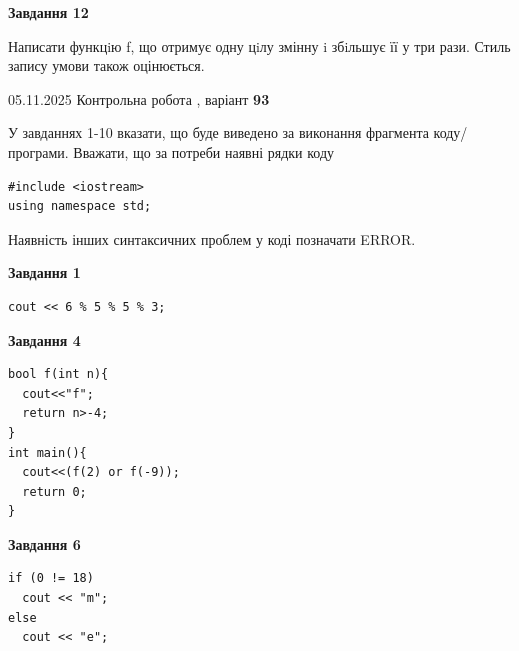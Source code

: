 \documentclass[12pt, ukrainian]{article}
\begin{document}
{\begin {large}
\begin{minipage}[t]{11.0cm}
\begin{center}
\textbf{Завдання 12}
\end{center}

Написати функцiю f, що отримує одну цiлу змінну i збiльшує її у три рази. Стиль запису умови також оцінюється.\par

\end{minipage}

\end {large}}
\newpage

{\Large{05.11.2025 Контрольна робота , варіант  \No \textbf { 93 }\par}}
{
\begin {large}
У завданнях 1-10 вказати, що буде виведено за виконання фрагмента коду/про\-гра\-ми.
Вважати, що за потреби наявні рядки коду
\begin{verbatim}
#include <iostream>
using namespace std;
\end{verbatim}
Наявність інших синтаксичних проблем у коді позначати ERROR.

\begin{minipage}[t]{7.0cm}

\begin{center}
\textbf{Завдання 1}
\end{center}
\vspace{-8mm}

\begin{verbatim}
cout << 6 % 5 % 5 % 3;
\end{verbatim}



\begin{center}
\textbf{Завдання 4}
\end{center}
\vspace{-8mm}

\begin{verbatim}
bool f(int n){
  cout<<"f";
  return n>-4;
}
int main(){
  cout<<(f(2) or f(-9));
  return 0;
}
\end{verbatim}



\begin{center}
\textbf{Завдання 6}
\end{center}
\vspace{-8mm}

\begin{verbatim}
if (0 != 18)
  cout << "m";
else
  cout << "e";
\end{verbatim}




\end{minipage}
\end{large}}
\end{document}
